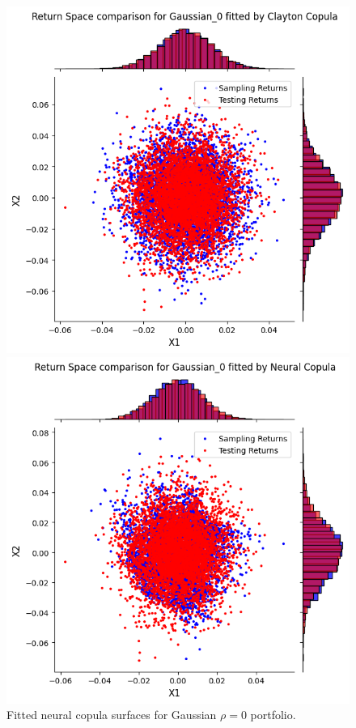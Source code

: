 \documentclass[%
a4paper,							
11pt,								
bibliography=totoc,						
abstracton=true					
]
{scrartcl}
\theoremstyle{plain}
\theoremstyle{definition}
\theoremstyle{remark}
\newcommand{\1}{\mathbbm{1}}
\begin{document}
\begin{figure}[H]
\begin{minipage}{0.49\textwidth}
    \end{minipage}
    \vfill
    \begin{minipage}{0.49\textwidth}
        \centering
        \includegraphics[width=\textwidth]{5ResultsDiscussion/pictures/PortfolioTest/Port1Clayton.png}
    \end{minipage}
    \hfill
    \begin{minipage}{0.49\textwidth}
        \centering
        \includegraphics[width=\textwidth]{5ResultsDiscussion/pictures/PortfolioTest/Port1NC.png}
    \end{minipage}
    \caption{Fitted neural copula surfaces for Gaussian $\rho=0$ portfolio.}
    \label{fig:GeneratedDataGaussian0}
\end{figure}
\end{document}
